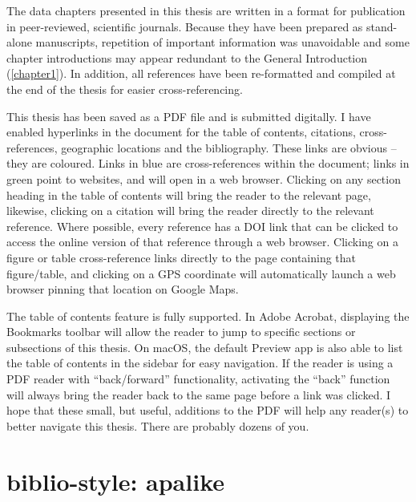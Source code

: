 \documentclass[
  oneside, 11pt, a4paper]{memoir}
\begin{document}
\OnehalfSpacing

The data chapters presented in this thesis are written in a format for publication in peer-reviewed, scientific journals. 
Because they have been prepared as stand-alone manuscripts, repetition of important information was unavoidable and some chapter introductions may appear redundant to the General Introduction (\autoref{chapter1}).
In addition, all references have been re-formatted and compiled at the end of the thesis for easier cross-referencing.

This thesis has been saved as a PDF file and is submitted digitally. I have enabled hyperlinks in the document for the table of contents, citations, cross-references, geographic locations and the bibliography. 
These links are obvious -- they are coloured. Links in {\color{ref} blue} are cross-references within the document; links in {\color{url} green} point to websites, and will open in a web browser.
Clicking on any section heading in the table of contents will bring the reader to the relevant page, likewise, clicking on a citation will bring the reader directly to the relevant reference.
Where possible, every reference has a DOI link that can be clicked to access the online version of that reference through a web browser.
Clicking on a figure or table cross-reference links directly to the page containing that figure/table, and clicking on a GPS coordinate will automatically launch a web browser pinning that location on Google Maps.

The table of contents feature is fully supported. In Adobe Acrobat, displaying the Bookmarks toolbar will allow the reader to jump to specific sections or subsections of this thesis. On macOS, the default Preview app is also able to list the table of contents in the sidebar for easy navigation. If the reader is using a PDF reader with ``back/forward'' functionality, activating the ``back'' function will always bring the reader back to the same page before a link was clicked.
I hope that these small, but useful, additions to the PDF will help any reader(s) to better navigate this thesis.
There are probably dozens of you.

\mainmatter

\setlength{\parindent}{0em} %

\hypersetup{linkcolor=black} %

{
\setcounter{tocdepth}{1}
\tableofcontents
}
\hypertarget{biblio-style-apalike}{%
\chapter{biblio-style: apalike}\label{biblio-style-apalike}}
\end{document}
